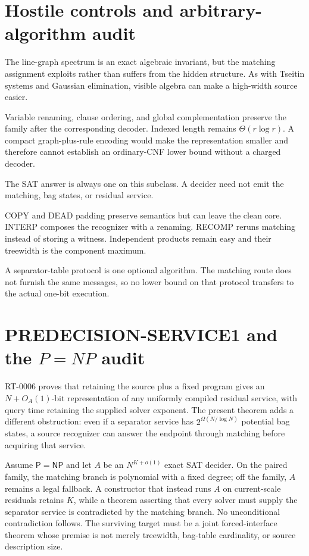 \documentclass[11pt]{article}
\newcommand{\Pclass}{\mathsf P}
\newcommand{\NPclass}{\mathsf{NP}}
\begin{document}
\section{Hostile controls and arbitrary-algorithm audit}
\begin{description}[leftmargin=3.0cm,style=nextline]
\item[Affine elimination.] The line-graph spectrum is an exact algebraic
invariant, but the matching assignment exploits rather than suffers from the
hidden structure.  As with Tseitin systems and Gaussian elimination, visible
algebra can make a high-width source easier.
\item[Alternative encodings.] Variable renaming, clause ordering, and global
complementation preserve the family after the corresponding decoder.
Indexed length remains $\Theta(r\log r)$.  A compact graph-plus-rule encoding
would make the representation smaller and therefore cannot establish an
ordinary-CNF lower bound without a charged decoder.
\item[One-bit output.] The SAT answer is always one on this subclass.  A
decider need not emit the matching, bag states, or residual service.
\item[Wrappers.] COPY and DEAD padding preserve semantics but can leave the
clean core.  INTERP composes the recognizer with a renaming.  RECOMP reruns
matching instead of storing a witness.  Independent products remain easy and
their treewidth is the component maximum.
\item[Communication.] A separator-table protocol is one optional algorithm.
The matching route does not furnish the same messages, so no lower bound on
that protocol transfers to the actual one-bit execution.
\end{description}

\section{PREDECISION-SERVICE1 and the $P=NP$ audit}
RT-0006 proves that retaining the source plus a fixed program gives an
$N+O_A(1)$-bit representation of any uniformly compiled residual service,
with query time retaining the supplied solver exponent.  The present theorem
adds a different obstruction: even if a separator service has
$2^{\Omega(N/\log N)}$ potential bag states, a source recognizer can answer
the endpoint through matching before acquiring that service.

Assume $\Pclass=\NPclass$ and let $A$ be an $N^{K+o(1)}$ exact SAT decider.
On the paired family, the matching branch is polynomial with a fixed degree;
off the family, $A$ remains a legal fallback.  A constructor that instead
runs $A$ on current-scale residuals retains $K$, while a theorem asserting
that every solver must supply the separator service is contradicted by the
matching branch.  No unconditional contradiction follows.  The surviving
target must be a joint forced-interface theorem whose premise is not merely
treewidth, bag-table cardinality, or source description size.
\end{document}
